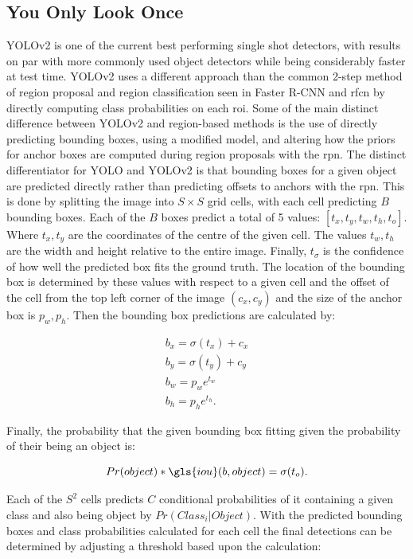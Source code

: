 \subsection{You Only Look Once}
YOLOv2 \cite{yolov2} is one of the current best performing single shot detectors, with results on par with more commonly used object detectors while being considerably faster at test time. YOLOv2 uses a different approach than the common 2-step method of region proposal and region classification seen in Faster R-CNN and \gls{rfcn} by directly computing class probabilities on each \gls{roi}. Some of the main distinct difference between YOLOv2 and region-based methods is the use of directly predicting bounding boxes, using a modified model, and altering how the priors for anchor boxes are computed during region proposals with the \gls{rpn}. The distinct differentiator for YOLO and YOLOv2 is that bounding boxes for a given object are predicted directly rather than predicting offsets to anchors with the \gls{rpn}. This is done by splitting the image into $S \times S$ grid cells, with each cell predicting $B$ bounding boxes. Each of the $B$ boxes predict a total of 5 values: $[t_x, t_y, t_w, t_h, t_o]$. Where $t_x, t_y$ are the coordinates of the centre of the given cell. The values $t_w, t_h$ are the width and height relative to the entire image. Finally, $t_\sigma$ is the confidence of how well the predicted box fits the ground truth. The location of the bounding box is determined by these values with respect to a given cell and the offset of the cell from the top left corner of the image $(c_x, c_y)$ and the size of the anchor box is $p_w, p_h$. Then the bounding box predictions are calculated by:

\begin{equation}
\begin{split}  
  b_x = \sigma(t_x) + c_x \\
  b_y = \sigma(t_y) + c_y \\
  b_w = p_we^{t_w} \\
  b_h = p_he^{t_h}.
\end{split}
\end{equation}

Finally, the probability that the given bounding box fitting given the probability of their being an object is:

\begin{equation}  
  Pr(object) * \gls{iou}(b, object) = \sigma(t_o).  
\end{equation}

Each of the $S^2$ cells predicts $C$ conditional probabilities of it containing a given class and also being object by $Pr(Class_i \rvert Object)$. With the predicted bounding boxes and class probabilities calculated for each cell the final detections can be determined by adjusting a threshold based upon the calculation:

